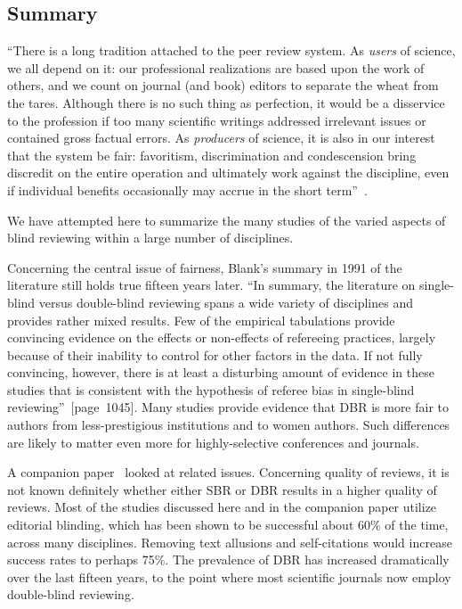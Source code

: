 \documentclass[acmtods,acmnow]{acmtrans2m}
\begin{document}
\subsection{Summary}
``There is a long tradition attached to the peer review system. As {\em
users} of science, we all depend on it: our professional realizations are
based upon the work of others, and we count on journal (and book) editors to
separate the wheat from the tares. Although there is no such thing as
perfection, it would be a disservice to the profession if too many
scientific writings addressed irrelevant issues or contained gross factual
errors. As {\em producers} of science, it is also in our interest that the
system be fair: favoritism, discrimination and condescension bring
discredit on the entire operation and ultimately work against the
discipline, even if individual benefits occasionally may accrue in the short
term''~\cite[page 324]{genest93}.

We have attempted here to summarize the many studies of the varied aspects
of blind reviewing within a large number of disciplines.

Concerning the central issue of fairness, Blank's summary in 1991 of the
literature still holds true fifteen years later.  ``In summary, the
literature on single-blind versus double-blind reviewing spans a wide
variety of disciplines and provides rather mixed results. Few of the
empirical tabulations provide convincing evidence on the effects or
non-effects of refereeing practices, largely because of their inability to
control for other factors in the data. If not fully convincing, however,
there is at least a disturbing amount of evidence in these studies that is
consistent with the hypothesis of referee bias in single-blind
reviewing''~[page~1045]. Many studies provide evidence that DBR is more fair to
authors from less-prestigious institutions and to women authors.
Such differences are likely to matter even more for highly-selective
conferences and journals.

A companion paper~\cite{DBR} looked at related issues.  Concerning quality
of reviews, it is not known definitely whether either SBR or DBR results in
a higher quality of reviews.  Most of the studies discussed here and in the
companion paper utilize editorial blinding, which has been shown to be
successful about 60\% of the time, across many disciplines. Removing text
allusions and self-citations would increase success rates to perhaps 75\%.
The prevalence of DBR has increased dramatically over the last fifteen
years, to the point where most scientific journals now employ double-blind
reviewing.
\end{document}
